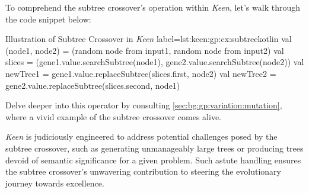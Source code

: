    To comprehend the subtree crossover's operation within \textit{Keen}, let's 
    walk through the code snippet below:

        \begin{code}{
        Illustration of Subtree Crossover in \textit{Keen}
        }{label=lst:keen:gp:cx:subtree}{kotlin}
        val (node1, node2) = (random node from input1, random node from input2)
        val slices = (gene1.value.searchSubtree(node1), gene2.value.searchSubtree(node2))
        val newTree1 = gene1.value.replaceSubtree(slices.first, node2)
        val newTree2 = gene2.value.replaceSubtree(slices.second, node1)
        \end{code}

    Delve deeper into this operator by consulting
    \vref{sec:bg:gp:variation:mutation}, where a vivid example of the subtree 
    crossover comes alive.

    \textit{Keen} is judiciously engineered to address potential challenges posed 
    by the subtree crossover, such as generating unmanageably large trees or 
    producing trees devoid of semantic significance for a given problem. Such 
    astute handling ensures the subtree crossover's unwavering contribution to 
    steering the evolutionary journey towards excellence.
